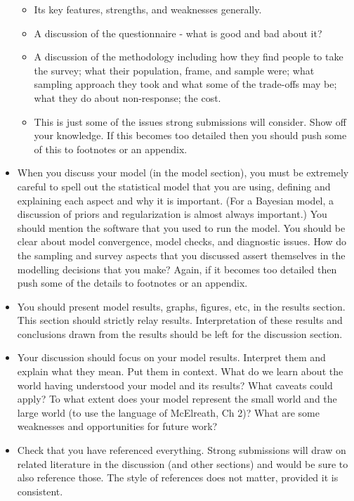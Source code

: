 \documentclass[
]{book}
\providecommand{\tightlist}{%
  \setlength{\itemsep}{0pt}\setlength{\parskip}{0pt}}
\begin{document}
\begin{itemize}
  \begin{itemize}
  \tightlist
  \item
    Its key features, strengths, and weaknesses generally.
  \item
    A discussion of the questionnaire - what is good and bad about it?
  \item
    A discussion of the methodology including how they find people to take the survey; what their population, frame, and sample were; what sampling approach they took and what some of the trade-offs may be; what they do about non-response; the cost.
  \item
    This is just some of the issues strong submissions will consider. Show off your knowledge. If this becomes too detailed then you should push some of this to footnotes or an appendix.
  \end{itemize}
\item
  When you discuss your model (in the model section), you must be extremely careful to spell out the statistical model that you are using, defining and explaining each aspect and why it is important. (For a Bayesian model, a discussion of priors and regularization is almost always important.) You should mention the software that you used to run the model. You should be clear about model convergence, model checks, and diagnostic issues. How do the sampling and survey aspects that you discussed assert themselves in the modelling decisions that you make? Again, if it becomes too detailed then push some of the details to footnotes or an appendix.
\item
  You should present model results, graphs, figures, etc, in the results section. This section should strictly relay results. Interpretation of these results and conclusions drawn from the results should be left for the discussion section.
\item
  Your discussion should focus on your model results. Interpret them and explain what they mean. Put them in context. What do we learn about the world having understood your model and its results? What caveats could apply? To what extent does your model represent the small world and the large world (to use the language of McElreath, Ch 2)? What are some weaknesses and opportunities for future work?
\item
  Check that you have referenced everything. Strong submissions will draw on related literature in the discussion (and other sections) and would be sure to also reference those. The style of references does not matter, provided it is consistent.

\end{itemize}
\end{document}
